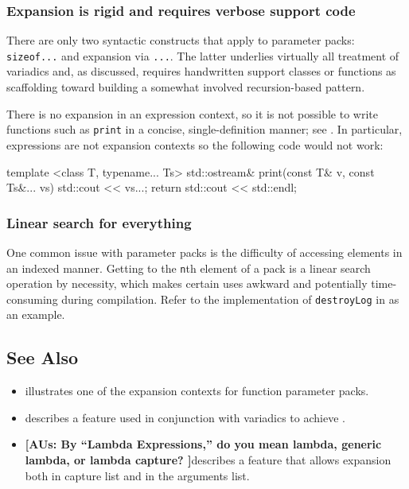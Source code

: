 \subsubsection[Expansion is rigid and requires verbose support code]{Expansion is rigid and requires verbose support code}\label{expansion-is-rigid-and-requires-verbose-support-code}

There are only two syntactic constructs that apply to parameter packs:
\lstinline!sizeof...! and expansion via \lstinline!...!. The latter underlies
virtually all treatment of variadics and, as discussed, requires
handwritten support classes or functions as scaffolding toward building
a somewhat involved recursion-based pattern.

There is no expansion in an expression context, so it is not possible to
write functions such as \lstinline!print! in a concise, single-definition
manner; see . In particular, expressions are not expansion contexts so
the following code would not work:

\begin{emcppslisting}
template <class T, typename... Ts>
std::ostream& print(const T& v, const Ts&... vs)
{
    std::cout << vs...;
    return std::cout << std::endl;
}
\end{emcppslisting}
    

\subsubsection[Linear search for everything]{Linear search for everything}\label{linear-search-for-everything}

One common issue with parameter packs is the difficulty of accessing
elements in an indexed manner. Getting to the \lstinline!n!th element of a
pack is a linear search operation by necessity, which makes certain uses
awkward and potentially time-consuming during compilation. Refer to the
implementation of \lstinline!destroyLog! in  as an example.

\subsection[See Also]{See Also}\label{see-also}

\begin{itemize}
\item{ illustrates one of the expansion contexts for function parameter packs.}
\item{describes a feature used in conjunction with variadics to achieve .}
\item{\seealsoref{}{}\textbf{[AUs: By ``Lambda Expressions,'' do you mean lambda, generic lambda, or lambda capture? ]}describes a feature that allows expansion both in capture list and in the arguments list.}
\end{itemize}

